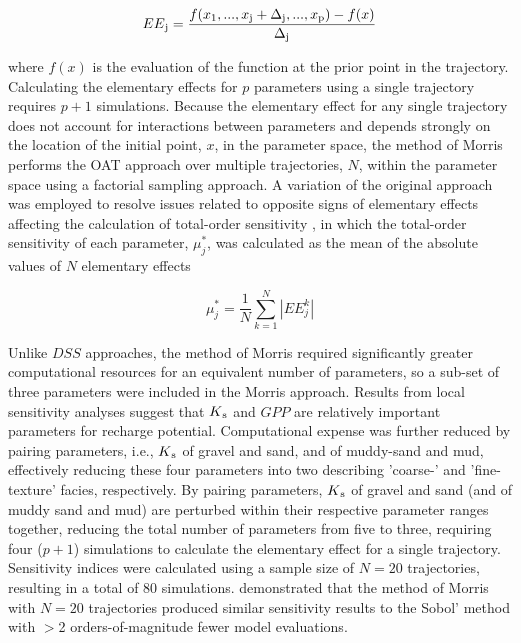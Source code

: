 \begin{equation}
EE\textsubscript{j} = \frac{f(x\textsubscript{1},...,x\textsubscript{j}+\Delta\textsubscript{j},...,x\textsubscript{p})-f(x)}{\Delta\textsubscript{j}}
\label{morris_eqn}
\end{equation}

\noindent where $f(x)$ is the evaluation of the function at the prior point in the trajectory. Calculating the elementary effects for $p$ parameters using a single trajectory requires $p+1$ simulations. Because the elementary effect for any single trajectory does not account for interactions between parameters and depends strongly on the location of the initial point, $x$, in the parameter space, the method of Morris performs the OAT approach over multiple trajectories, $N$, within the parameter space using a factorial sampling approach. A variation of the original approach was employed to resolve issues related to opposite signs of elementary effects affecting the calculation of total-order sensitivity \citep{campolongo2007effective}, in which the total-order sensitivity of each parameter, $\mu_j^*$, was calculated as the mean of the absolute values of $N$ elementary effects

\begin{equation}
 \mu_j^* = \frac{1}{N}\displaystyle\sum_{k=1}^N \left|EE_j^k\right|
 \label{mu_eqn}
\end{equation}

Unlike $DSS$ approaches, the method of Morris required significantly greater computational resources for an equivalent number of parameters, so a sub-set of three parameters  were included in the Morris approach. Results from local sensitivity analyses suggest that $K\textsubscript{s}$ and $GPP$ are relatively important parameters for recharge potential. Computational expense was further reduced by pairing parameters, i.e., $K\textsubscript{s}$ of gravel and sand, and of muddy-sand and mud, effectively reducing these four parameters into two describing 'coarse-' and 'fine-texture' facies, respectively. By pairing parameters, $K\textsubscript{s}$ of gravel and sand (and of muddy sand and mud) are perturbed within their respective parameter ranges together, reducing the total number of parameters from five to three, requiring four ($p+1$) simulations to calculate the elementary effect for a single trajectory. Sensitivity indices were calculated using a sample size of $N = 20$ trajectories, resulting in a total of 80 simulations. \cite{herman2013method} demonstrated that the method of Morris with $N = 20$ trajectories produced similar sensitivity results to the Sobol' method \citep{sobol2001global} with $>$2 orders-of-magnitude fewer model evaluations.

